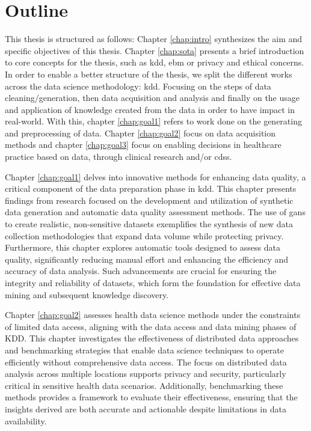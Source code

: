 \chapter*{Outline}



This thesis is structured as follows:
Chapter \ref{chap:intro} synthesizes the aim and specific objectives of this thesis.
Chapter \ref{chap:sota} presents a brief introduction to core concepts for the thesis, such as \ac{kdd}, \ac{ebm} or privacy and ethical concerns.\\
In order to enable a better structure of the thesis, we split the different works across the data science methodology: \ac{kdd}. Focusing on the steps of data cleaning/generation, then data acquisition and analysis and finally on the usage and application of knowledge created from the data in order to have impact in real-world. With this, chapter \ref{chap:goal1} refers to work done on the generating  and preprocessing of data. Chapter \ref{chap:goal2} focus on data acquisition methods and chapter \ref{chap:goal3} focus on enabling decisions in healthcare practice based on data, through clinical research and/or \ac{cdss}. 

Chapter \ref{chap:goal1} delves into innovative methods for enhancing data quality, a critical component of the data preparation phase in \ac{kdd}. This chapter presents findings from research focused on the development and utilization of synthetic data generation and automatic data quality assessment methods. The use of \acp{gan} to create realistic, non-sensitive datasets exemplifies the synthesis of new data collection methodologies that expand data volume while protecting privacy. Furthermore, this chapter explores automatic tools designed to assess data quality, significantly reducing manual effort and enhancing the efficiency and accuracy of data analysis. Such advancements are crucial for ensuring the integrity and reliability of datasets, which form the foundation for effective data mining and subsequent knowledge discovery.

Chapter \ref{chap:goal2} assesses health data science methods under the constraints of limited data access, aligning with the data access and data mining phases of KDD. This chapter investigates the effectiveness of distributed data approaches and benchmarking strategies that enable data science techniques to operate efficiently without comprehensive data access. The focus on distributed data analysis across multiple locations supports privacy and security, particularly critical in sensitive health data scenarios. Additionally, benchmarking these methods provides a framework to evaluate their effectiveness, ensuring that the insights derived are both accurate and actionable despite limitations in data availability.

